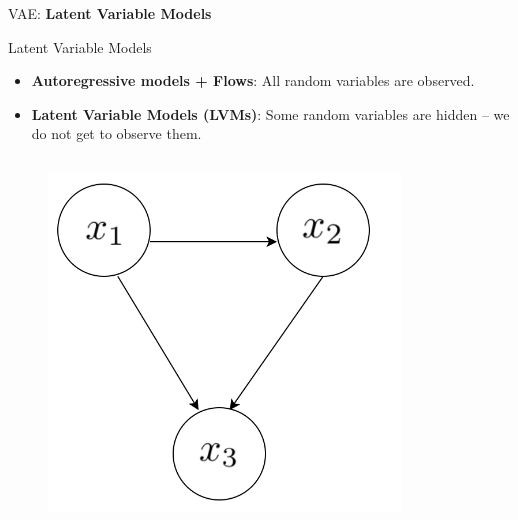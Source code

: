 \begin{frame}{}
    \LARGE VAE: \textbf{Latent Variable Models}
\end{frame}

\begin{frame}[allowframebreaks]{Latent Variable Models}
\begin{itemize}
    \item \textbf{Autoregressive models + Flows}: All random variables are observed.
    \item \textbf{Latent Variable Models (LVMs)}: Some random variables are hidden -- we do not get to observe them.
\end{itemize}
\vspace{1em}
\begin{columns}
        \begin{column}{0.6\linewidth}
            \begin{figure}
                \centering
                \includegraphics[height=0.6\textheight]{images/vae/latent-graph-1.png}
            \end{figure}
        \end{column}
        \begin{column}{0.4\linewidth}
            \begin{figure}
                \centering

\end{figure}
\end{column}
\end{columns}
\end{frame}
